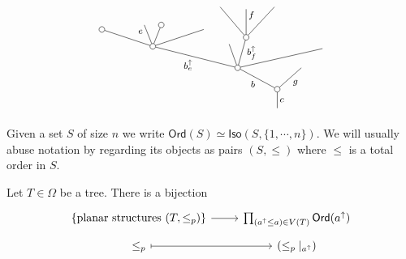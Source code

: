 \documentclass[a4paper,10pt]{article}%
\begin{document}
\begin{example}
\[
	\begin{tikzpicture}[grow=up,auto,level distance=1.9em,
	every node/.style = {font=\footnotesize,inner sep=2pt},
	dummy/.style={circle,draw,inner sep=0pt,minimum size=1.75mm}]
		\node at (0,0) {}
			child{node [dummy] {}
				child{
				edge from parent node [swap] {$g$}}
				child[sibling distance = 7em]{node [dummy] {}
					child[sibling distance = 5em,level distance=1.7em]
					child[sibling distance = 1.5em,level distance=2.7em]{node [dummy] {}
						child[sibling distance = 2.5em]{
						edge from parent node [near end,swap] {}}
						child[level distance=2.5em]{
						edge from parent node [near end,swap] {$f$}}				
						child[sibling distance = 2.3em]{
						edge from parent node [near end] {}}
					edge from parent node [swap,very near end] {$b^{\uparrow}_{f}$}}
					child[sibling distance = 1.5em,level distance =2.1em]{
					edge from parent node [swap] {}}
					child[sibling distance = 5em]{node [dummy] {}
						child[sibling distance =3em, level distance = 1.5 em]{
						edge from parent node [swap] {}}
						child[sibling distance = 1.5em]{node [dummy] {}
						edge from parent node [very near end,swap] {}}
						child[sibling distance =1.5em]{
						edge from parent node [very near end] {$e$}}
						child[sibling distance =3em,level distance =1.5em]{node [dummy] {}
						edge from parent node {}}
					edge from parent node {$b^{\uparrow}_e$}}
				edge from parent node {$b$}}
			edge from parent node [swap] {$c$}};
	\end{tikzpicture}
\]
\end{example}

\begin{notation}
	Given a set $S$ of size $n$ we write
	$\textsf{Ord}(S) \simeq \mathsf{Iso}(S,\{1,\cdots,n\})$. We will usually abuse notation by regarding its objects as pairs $(S,\leq)$ where $\leq$ is a total order in $S$.
\end{notation}


\begin{proposition}\label{PLANARIZATIONCHAR PROP}
	Let $T \in \Omega$ be a tree. There is a bijection
	\begin{equation}\label{PLANAR EQ}
	\begin{tikzcd}[row sep = 0.5em]
		\{\text{planar structures }(T,\leq_p)\} \ar[r] &
		\prod_{(a^{\uparrow} \leq a) \in V(T)} \mathsf{Ord}(a^{\uparrow}) \\
		\leq_p \ar[mapsto]{r} & (\leq_p|_{a^{\uparrow}})
	\end{tikzcd}	
	\end{equation}
\end{proposition}
\end{document}
